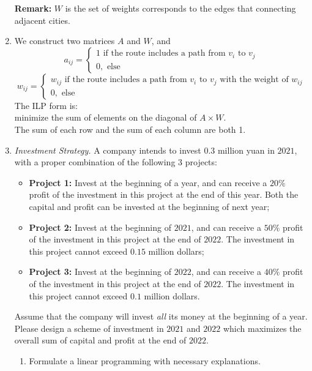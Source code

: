 \documentclass[12pt,a4paper]{article}
\makeatletter
\newtheorem*{solution}{Solution}
\theoremstyle{definition}
\renewenvironment{solution}[1][Solution] {\par\pushQED{\qed}\normalfont\topsep6\p@\@plus6\p@\relax\trivlist\item[\hskip\labelsep\bfseries#1\@addpunct{.}]\ignorespaces}{\popQED\endtrivlist\@endpefalse} \makeatother
\makeatother
\begin{document}
\begin{enumerate}
    \textbf{Remark:} $ W $ is the set of weights corresponds to the edges that connecting adjacent cities.  
    \begin{solution}
      We construct two matrices $A$ and $W$, and
      $$ a_{ij}=\left\{
      \begin{aligned}
      1 \text{ if the route includes a path from }v_i\text{ to }v_j \\
      0 ,\text{ else}
      \end{aligned}
      \right.
      $$
      $$ w_{ij}=\left\{
      \begin{aligned}
      w_{ij} \text{ if the route includes a path from }v_i\text{ to }v_j\text{ with the weight of }w_{ij} \\
      0 ,\text{ else}
      \end{aligned}
      \right.
      $$
      The ILP form is:
      \\minimize the sum of elements on the diagonal of $A\times W$.
      \\The sum of each row and the sum of each column are both 1.
    \end{solution}
    \item
    \textit{Investment Strategy.} A company intends to invest $0.3$ million yuan in $2021$, with a proper combination of the following $3$ projects:
    \begin{itemize}
    \item \textbf{Project 1:} Invest at the beginning of a year, and can receive a $20\%$ profit of the investment in this project at the end of this year. Both the capital and profit can be invested at the beginning of next year;
    \item \textbf{Project 2:} Invest at the beginning of $2021$, and can receive a $50\%$ profit of the investment in this project at the end of $2022$. The investment in this project cannot exceed $0.15$ million dollars;
    \item \textbf{Project 3:} Invest at the beginning of $2022$, and can receive a $40\%$ profit of the investment in this project at the end of $2022$. The investment in this project cannot exceed $0.1$ million dollars.
    \end{itemize}
    Assume that the company will invest \emph{all} its money at the beginning of a year. Please design a scheme of investment in $2021$ and $2022$ which maximizes the overall sum of capital and profit at the end of $2022$.
    \begin{enumerate}
    \item
    Formulate a linear programming with necessary explanations.


\end{enumerate}
\end{enumerate}
\end{document}
